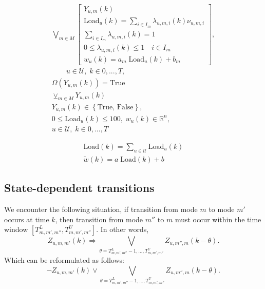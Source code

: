 \documentclass{tufte-handout}
\begin{document}
\begin{gather*}
\bigvee_{m \in M}
  \begin{bmatrix} 
    Y_{u,m} \left(k\right)\\
    \text{Load}_u \left(k\right) = \sum_{i \in I_m} \lambda_{u,m,i} \left(k \right) \nu_{u, m, i}
    \\ 
    \sum_{i \in I_m} \lambda_{u, m,i} \left(k \right) = 1 \\
    0 \leq \lambda_{u, m,i} \left(k \right) \leq 1 \quad i\in I_m \\
    w_u \left(k \right) = a_m \; \text{Load}_u \left(k \right) + b_m
  \end{bmatrix}, \\
 \qquad u \in \mathcal{U}, \; k \in {0,...,T}, \\
\Omega \left(Y_{u,m} \left( k\right) \right) = \text{True} \\
\veebar_{m \in M} Y_{u,m} \left(k\right) \\
Y_{u, m} \left(k \right) \in \left\{\text{True, False} \right\}, \\
0 \leq \text{Load}_u \left(k \right) \leq 100, \; w_u \left(k\right) \in \mathbb{R}^{n},\\
u \in \mathcal{U}, \; k \in {0,...,T}
\end{gather*}



\begin{gather*}
\text{Load}\left(k\right) = \sum_{u \in \mathcal{U}} \text{Load}_u\left(k\right) \\
\tilde{w} \left(k \right) = a \; \text{Load} \left(k \right) + b
\end{gather*}

\subsection{State-dependent transitions}

We encounter the following situation, if transition from mode $m$ to mode $m'$ occurs at time $k$, then transition from mode
$m''$ to $m$ must occur within the time window $\left[T^{L}_{m, m', m''}, T^{U}_{m, m', m''} \right]$. In other words,
\begin{equation}
    Z_{u,m,m'} \left(k\right) \Rightarrow \bigvee_{\theta = T^{L}_{m, m', m''}-1, \dots, T^{U}_{m, m', m''}} Z_{u, m'', m}\left(k - \theta\right).
\end{equation}
Which can be reformulated as follows:
\[
    \neg Z_{u, m, m'} \left(k \right)\vee \bigvee_{\theta = T^{L}_{m, m', m''}-1, \dots, T^{U}_{m, m', m''}} Z_{u, m'', m}\left(k - \theta\right).
\]
\end{document}
